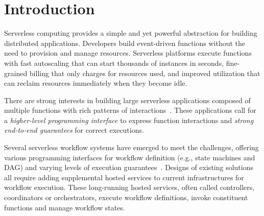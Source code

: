 \section{Introduction}


Serverless computing provides a simple and yet powerful abstraction for
building distributed applications. Developers build event-driven functions
without the need to provision and manage resources. Serverless platforms
execute functions with fast autoscaling that can start thousands of instances
in seconds, fine-grained billing that only charges for resources used, and
improved utilization that can reclaim resources immediately when they become
idle.

There are strong interests in building large serverless applications composed
of multiple functions with rich patterns of interactions~\cite{excamera,
pywren, gg-atc, beldi, boki}. These applications call for a \emph{higher-level
programming interface} to express function interactions and \emph{strong
end-to-end guarantees} for correct executions.

Several serverless workflow systems have emerged to meet the challenges,
offering various programming interfaces for workflow definition (e.g., state
machines and DAG) and varying levels of execution guarantees~\cite{excamera,
gg-atc, aws-step-functions, google-cloud-composer, google-workflows,
durable-functions, kappa}. Designs of existing solutions all require adding
supplemental hosted services to current infrastructures for workflow
execution. These long-running hosted services, often called controllers,
coordinators or orchestrators, execute workflow definitions, invoke
constituent functions and manage workflow states.


